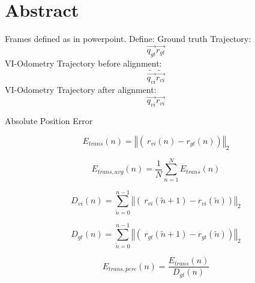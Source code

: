 \chapter*{Abstract}

Frames defined as in powerpoint.
Define:
Ground truth Trajectory: 
\begin{equation}
       \vec{q_{gt}} \vec{r_{gt}}
\end{equation}
VI-Odometry Trajectory before alignment:
\begin{equation}
       \tilde{\vec{q_{vi}}} \tilde{\vec{r_{vi}}}
\end{equation}
VI-Odometry Trajectory after alignment:
\begin{equation}
       \vec{q_{vi}} \vec{r_{vi}}
\end{equation}

Absolute Position Error

\begin{equation}
       E_{trans} \left( n \right) = \left\Vert\left(\ r_{vi} \left( n \right) - r_{gt} \left( n \right) \right) \right\Vert_2
\end{equation}

\begin{equation}
       E_{trans, avg} \left( n \right) = \frac{1}{N} \sum_{n=1}^N E_{trans} \left( n \right)
\end{equation}

\begin{equation}
       D_{vi} \left( n \right) = \sum_{\tilde{n}=0}^{n-1} \left\Vert\left(\ r_{vi} \left( \tilde{n}+1 \right) - r_{vi} \left( \tilde{n} \right) \right) \right\Vert_2
\end{equation}

\begin{equation}
       D_{gt} \left( n \right) = \sum_{\tilde{n}=0}^{n-1} \left\Vert\left(\ r_{gt} \left( \tilde{n}+1 \right) - r_{gt} \left( \tilde{n} \right) \right) \right\Vert_2
\end{equation}

\begin{equation}
       E_{trans, perc} \left( n \right) = \frac{E_{trans} \left( n \right)}{D_{gt} \left( n \right)}
\end{equation}

